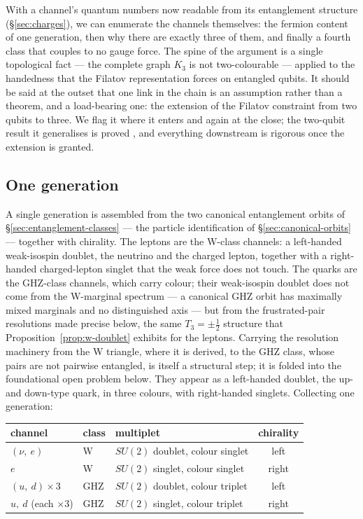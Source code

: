 With a channel's quantum numbers now readable from its entanglement structure (\S\ref{sec:charges}),
we can enumerate the channels themselves: the fermion content of one generation, then why there are
exactly three of them, and finally a fourth class that couples to no gauge force. The spine of the argument
is a single topological fact --- the complete graph $K_3$ is not two-colourable --- applied to the
handedness that the Filatov representation forces on entangled qubits. It should be said at the
outset that one link in the chain is an assumption rather than a theorem, and a load-bearing one:
the extension of the Filatov constraint from two qubits to three. We flag it where it enters and
again at the close; the two-qubit result it generalises is proved \autocite{filatov2024towards}, and
everything downstream is rigorous once the extension is granted.

\subsection{One generation}

A single generation is assembled from the two canonical entanglement orbits of
\S\ref{sec:entanglement-classes} --- the particle identification of \S\ref{sec:canonical-orbits} ---
together with chirality. The leptons are the W-class channels: a left-handed weak-isospin doublet,
the neutrino and the charged lepton, together with a right-handed charged-lepton singlet that the
weak force does not touch. The quarks are the GHZ-class channels, which carry colour; their
weak-isospin doublet does not come from the W-marginal spectrum --- a canonical GHZ orbit has
maximally mixed marginals and no distinguished axis --- but from the frustrated-pair resolutions
made precise below, the same $T_3 = \pm\tfrac12$ structure that Proposition~\ref{prop:w-doublet}
exhibits for the leptons. Carrying the resolution machinery from the W triangle, where it is
derived, to the GHZ class, whose pairs are not pairwise entangled, is itself a structural step; it
is folded into the foundational open problem below. They appear as a left-handed doublet, the up- and down-type quark, in
three colours, with right-handed singlets. Collecting one generation:

\begin{center}
\begin{tabular}{lllc}
\hline
channel & class & multiplet & chirality \\
\hline
$(\nu,\ e)$            & W   & $SU(2)$ doublet, colour singlet      & left \\
$e$                    & W   & $SU(2)$ singlet, colour singlet      & right \\
$(u,\ d)\times 3$      & GHZ & $SU(2)$ doublet, colour triplet      & left \\
$u,\ d$ (each $\times3$) & GHZ & $SU(2)$ singlet, colour triplet    & right \\
\hline
\end{tabular}
\end{center}

